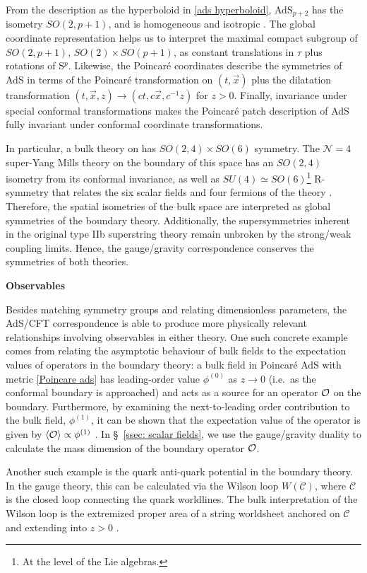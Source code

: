\documentclass[../PhD.tex]{subfiles}
\begin{document}
From the description as the hyperboloid in \eqref{ads hyperboloid}, AdS$_{p+2}$ has the isometry $SO(2,p+1)$, and is homogeneous and isotropic \cite{hep-th/9905111}. The global coordinate representation helps us to interpret the maximal compact subgroup of $SO(2, p+1)$, $SO(2)\times SO(p+1)$, as constant translations in $\tau$ plus rotations of S$^p$. Likewise, the Poincar\'e coordinates describe the symmetries of AdS in terms of the Poincar\'e transformation on $(t, \vec x)$ plus the dilatation transformation {$(t, \vec x, z) \to (ct, c \vec x, c^{-1}z)$} for $z >0$. Finally, invariance under special conformal transformations makes the Poincar\'e patch description of AdS fully invariant under conformal coordinate transformations.

In particular, a bulk theory on \ads has $SO(2,4)\times SO(6)$ symmetry. The $\mathcal N = 4$ super-Yang Mills theory on the boundary of this space has an $SO(2,4)$ isometry from its conformal invariance, as well as $SU(4) \simeq SO(6)$\footnote{At the level of the Lie algebras.} R-symmetry that relates the six scalar fields and four fermions of the theory \cite{hep-th/9711200}. Therefore, the spatial isometries of the bulk space are interpreted as global symmetries of the boundary theory. Additionally, the supersymmetries inherent in the original type IIb superstring theory remain unbroken by the strong/weak coupling limits. Hence, the gauge/gravity correspondence conserves the symmetries of both theories.

{\bf Observables}

Besides matching symmetry groups and relating dimensionless parameters, the AdS/CFT correspondence is able to produce more physically relevant relationships involving observables in either theory. One such concrete example comes from relating the asymptotic behaviour of bulk fields to the expectation values of operators in the boundary theory: a bulk field in Poincar\'e AdS with metric \eqref{Poincare ads} has leading-order value $\phi^{(0)}$ as $z \to 0$ (i.e.~as the conformal boundary is approached) and acts as a source for an operator $\mathcal O$ on the boundary. Furthermore, by examining the next-to-leading order contribution to the bulk field, $\phi^{(1)}$, it can be shown that the expectation value of the operator is given by $\langle \mathcal O \rangle \propto \phi^{(1)}$ \cite{hep-th/9905104}. In \S~\!\ref{ssec: scalar fields}, we use the gauge/gravity duality to calculate the mass dimension of the boundary operator $\mathcal O$.

Another such example is the quark anti-quark potential in the boundary theory. In the gauge theory, this can be calculated via the Wilson loop $W(\mathcal C)$, where $\mathcal C$ is the closed loop connecting the quark worldlines. The bulk interpretation of the Wilson loop is the extremized proper area of a string worldsheet anchored on $\mathcal C$ and extending into $z > 0$ \cite{hep-th/9803002}. 
\end{document}
